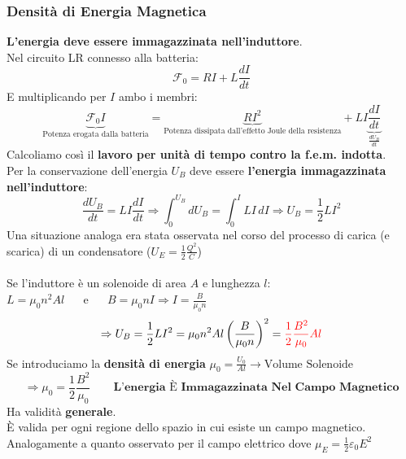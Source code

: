 \documentclass[../main.tex]{subfiles}
\begin{document}
	\subsubsection{Densità di Energia Magnetica}
	\textbf{L'energia deve essere immagazzinata nell'induttore}.\\
	Nel circuito LR connesso alla batteria:
	$$\mathscr{F}_0 = RI + L \frac{dI}{dt}$$
	E multiplicando per $I$ ambo i membri:
	$$\underbrace{\mathscr{F}_0 I}_{\text{Potenza erogata dalla batteria}} = \underbrace{RI^2}_{\text{Potenza dissipata dall'effetto Joule della resistenza}} + LI \underbrace{\frac{dI}{dt}}_{\frac{dU_B}{dt}}$$
	Calcoliamo così il \textbf{lavoro per unità di tempo contro la f.e.m. indotta}.\\
	Per la conservazione dell’energia $U_B$ deve essere \textbf{l’energia immagazzinata nell’induttore}:
	$$\frac{dU_B}{dt} = LI \frac{dI}{dt} \Rightarrow \int_0^{U_B} dU_B = \int_0^I LI \, dI \Rightarrow \boxed{U_B = \frac{1}{2}LI^2}$$
	Una situazione analoga era stata osservata nel corso del processo di carica (e scarica) di un condensatore ($U_E = \frac{1}{2} \frac{Q^2}{C}$)\\\\
	Se l’induttore è un solenoide di area $A$ e lunghezza $l$:\\
	$L = \mu_0 n^2 Al$ $\quad$ e $\quad$ $B = \mu_0 n I \Rightarrow I = \frac{B}{\mu_0 n}$
	$$\Rightarrow U_B = \frac{1}{2}LI^2 = \mu_0 n^2 Al \left(\frac{B}{\mu_0 n}\right)^2 = {\color{red} \frac{1}{2} \frac{B^2}{\mu_0} Al}$$
	Se introduciamo la \textbf{densità di energia} $\mu_0 = \frac{U_0}{Al} \rightarrow \text{Volume Solenoide}$
	$$\Rightarrow \boxed{\mu_0 = \frac{1}{2} \frac{B^2}{\mu_0}} \qquad \textbf{L’energia È Immagazzinata Nel Campo Magnetico}$$
	Ha validità \textbf{generale}. \\
	È valida per ogni regione dello spazio in cui esiste un campo magnetico.\\
	Analogamente a quanto osservato per il campo elettrico dove $\mu_E = \frac{1}{2} \varepsilon_0 E^2$
\end{document}
